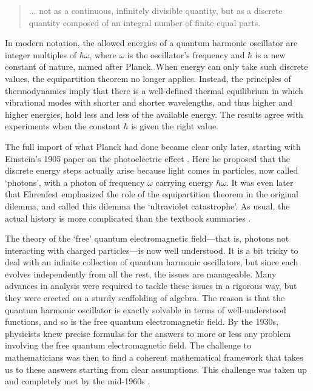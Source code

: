 \documentclass[12pt]{article}
\begin{document}
\begin{quote}
... not as a continuous, infinitely divisible quantity, but as a discrete quantity composed of an integral number of finite equal parts.
\end{quote}

In modern notation, the allowed energies of a quantum harmonic oscillator are integer multiples of $\hbar \omega$, where $\omega$ is the oscillator's frequency and $\hbar$ is a new constant of nature, named after Planck.   When energy can only take such discrete values, the equipartition theorem no longer applies.  Instead, the principles of thermodynamics imply that there is a well-defined thermal equilibrium in which vibrational modes with shorter and shorter wavelengths, and thus higher and higher energies, hold less and less of the available energy.   The results agree with experiments when the constant $\hbar$ is given the right value.

The full import of what Planck had done became clear only later, starting with Einstein's 1905 paper on the photoelectric effect \cite{Einstein}.  Here he proposed that the discrete energy steps actually arise because light comes in particles, now called `photons', with a photon of frequency $\omega$ carrying energy $\hbar \omega$.   It was even later that Ehrenfest emphasized the role of the equipartition theorem in the original dilemma, and called this dilemma the `ultraviolet catastrophe'.  As usual, the actual history is more complicated than the textbook summaries \cite{Kragh}.

The theory of the `free' quantum electromagnetic field---that is, photons not interacting with charged particles---is now well understood.   It is a bit tricky to deal with an infinite collection of quantum harmonic oscillators, but since each evolves independently from all the rest, the issues are manageable.  Many advances in analysis were required to tackle these issues in a rigorous way, but they were erected on a sturdy scaffolding of algebra.  The reason is that the quantum harmonic oscillator is exactly solvable in terms of well-understood functions, and so is the free quantum electromagnetic field.   By the 1930s,  physicists knew precise formulas for the answers to more or less any problem involving the free quantum electromagnetic field.  The challenge to mathematicians was then to find a coherent mathematical framework that takes us to these answers starting from clear assumptions.  This challenge was taken up and completely met by the mid-1960s \cite{BSZ}.
\end{document}
